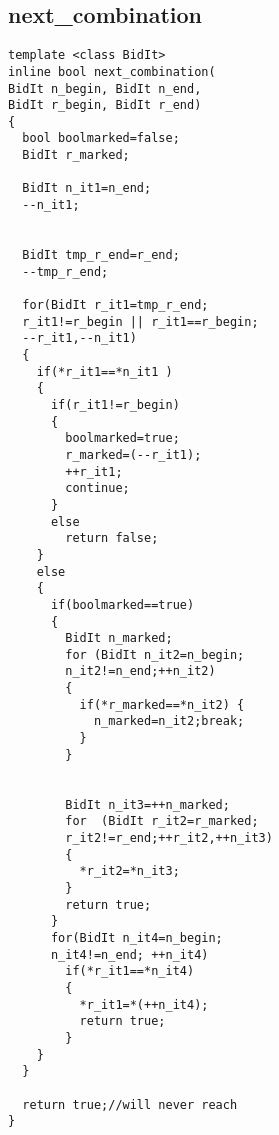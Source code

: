 \subsection{next\_combination}
\label{app:nextcombination}
\begin{verbatim}
template <class BidIt>
inline bool next_combination(
BidIt n_begin, BidIt n_end,
BidIt r_begin, BidIt r_end)
{
  bool boolmarked=false;
  BidIt r_marked;

  BidIt n_it1=n_end;
  --n_it1;


  BidIt tmp_r_end=r_end;
  --tmp_r_end;

  for(BidIt r_it1=tmp_r_end;
  r_it1!=r_begin || r_it1==r_begin;
  --r_it1,--n_it1)
  {
    if(*r_it1==*n_it1 )
    { 
      if(r_it1!=r_begin)
      {
        boolmarked=true;
        r_marked=(--r_it1);
        ++r_it1;
        continue;
      }
      else
        return false;    
    }
    else
    {
      if(boolmarked==true)
      {
        BidIt n_marked;
        for (BidIt n_it2=n_begin;
        n_it2!=n_end;++n_it2)
        {
          if(*r_marked==*n_it2) {
            n_marked=n_it2;break;
          }
        }


        BidIt n_it3=++n_marked;  
        for  (BidIt r_it2=r_marked;
        r_it2!=r_end;++r_it2,++n_it3)
        {
          *r_it2=*n_it3;
        }
        return true;
      }
      for(BidIt n_it4=n_begin;
      n_it4!=n_end; ++n_it4)
        if(*r_it1==*n_it4)
        {
          *r_it1=*(++n_it4);
          return true;       
        }
    }
  }  

  return true;//will never reach
}
\end{verbatim}

